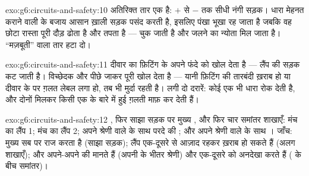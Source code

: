 \begin{solution}{exo:g6:circuits-and-safety:10}
अतिरिक्त तार एक  है: $+$ से $-$ तक सीधी नंगी सड़क। धारा मेहनत
कराने वाली  के बजाय आसान ख़ाली सड़क पसंद करती है, इसलिए पंखा भूखा
रह जाता है जबकि वह छोटा रास्ता पूरी दौड़ ढोता है और तपता है ---
 चुक जाती है और जलने का न्योता मिल जाता है। ``मज़बूती'' वाला तार
हटा दो।
\end{solution}

\begin{solution}{exo:g6:circuits-and-safety:11}
दीवार का  फ़िटिंग के अपने फंदे को खोल देता है --- लैंप की सड़क
कट जाती है। विच्छेदक और पीछे जाकर पूरी  खोल देता है --- यानी
फ़िटिंग की तारबंदी ख़राब हो या दीवार के  पर ग़लत लेबल लगा हो, तब
भी  मुर्दा रहती है।  लगी दो दरारें: कोई एक भी धारा रोक
देती है, और दोनों मिलकर किसी एक के बारे में हुई ग़लती माफ़ कर देती
हैं।
\end{solution}

\begin{solution}{exo:g6:circuits-and-safety:12}
, फिर साझा सड़क पर मुख्य , और फिर चार समांतर शाखाएँ: मंच का
लैंप 1; मंच का लैंप 2; अपने श्रेणी वाले  के साथ परदे की ; और
अपने श्रेणी वाले  के साथ । जाँच: मुख्य  सब पर राज करता
है (साझा सड़क); लैंप एक-दूसरे से आज़ाद रहकर ख़राब हो सकते हैं (अलग
शाखाएँ);  और  अपने-अपने  की मानते हैं (अपनी  के भीतर
श्रेणी) और एक-दूसरे को अनदेखा करते हैं ( के बीच समांतर)।
\end{solution}

